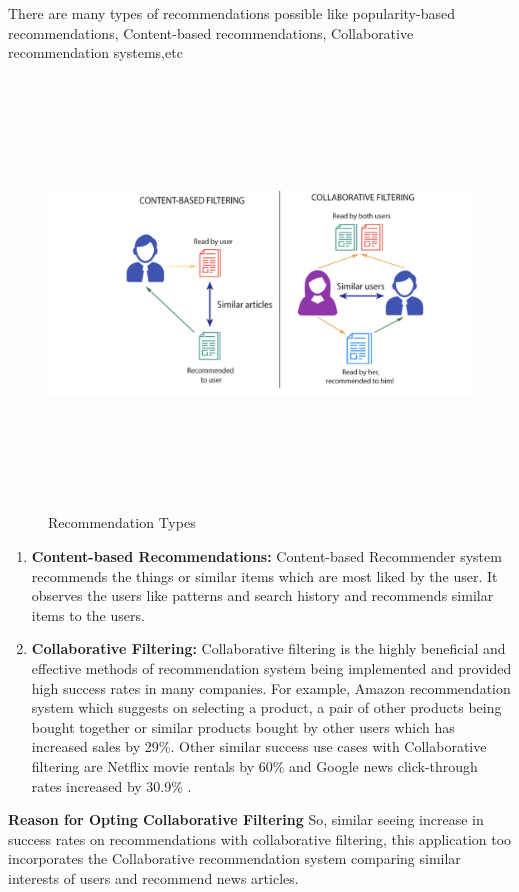 \begin{enumerate}
    There are many types of recommendations possible like popularity-based recommendations, Content-based recommendations, Collaborative recommendation systems,etc 
    \begin{center}
    \begin{figure}[h!]
    \includegraphics[scale=0.7,width=7in,height=4.5in]{images/recommendation system.png}
    \centering \caption{Recommendation Types}
    \end{figure}
        \end{center}
   \begin{enumerate}
      \item\textbf{ Content-based Recommendations:}
            Content-based Recommender system recommends the things or similar items which are most liked by the user.
            It observes the users like patterns and search history and recommends similar items to the users.
   \item\textbf{ Collaborative Filtering:} 
            Collaborative filtering is the highly beneficial and effective methods of recommendation system being implemented and provided high success rates in many companies. For example, Amazon recommendation system which suggests on selecting a product, a pair of other products being bought together or similar products bought by other users which has increased sales by 29\%. Other similar success use cases with Collaborative filtering are Netflix movie rentals by 60\% and Google news click-through rates increased by 30.9\% \cite{lee2015a}.
   \end{enumerate}
\textbf{ Reason for Opting Collaborative Filtering} \newline
  So, similar seeing increase in success rates on recommendations with collaborative filtering, this application too incorporates the Collaborative recommendation system comparing similar interests of users and recommend news articles.
  

\end{enumerate}
